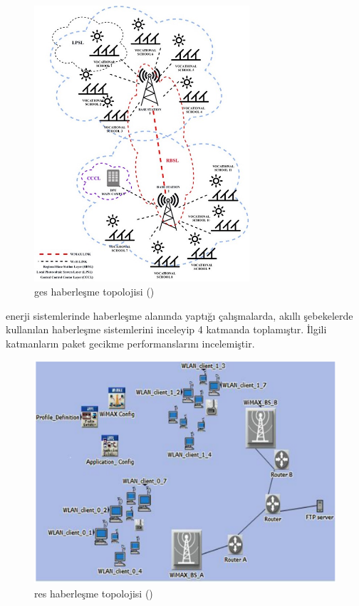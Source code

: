 \begin{figure}[htbp]
\centerline{\includegraphics[width=8cm]{Resim/makaledonmez.jpg}}
\caption{\gls{ges} haberleşme topolojisi (\protect{}) }
\label{sekildonmezmakale}
\end{figure}

\cite{eltamaly2021iot} enerji sistemlerinde haberleşme alanında yaptığı çalışmalarda, akıllı şebekelerde kullanılan haberleşme sistemlerini inceleyip 4 katmanda toplamıştır. İlgili katmanların paket gecikme performanslarını incelemiştir.

\begin{figure}[htbp]
\centerline{\includegraphics[width=12cm]{Resim/Sekil2-3.png}}
\caption{\gls{res} haberleşme topolojisi (\protect{}) }
\label{fig:figure4}
\end{figure}

